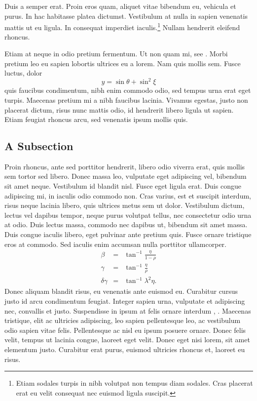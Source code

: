 Duis a semper erat. Proin eros quam, aliquet vitae bibendum eu, vehicula et purus. In hac habitasse platea dictumst. Vestibulum at nulla in sapien venenatis mattis ut eu ligula. In consequat imperdiet iaculis.\footnote{Etiam sodales turpis in nibh volutpat non tempus diam sodales. Cras placerat erat eu velit consequat nec euismod ligula suscipit.} Nullam hendrerit eleifend rhoncus.

Etiam at neque in odio pretium fermentum. Ut non quam mi, see \cite{hyvarinen2001ica}. Morbi pretium leo eu sapien lobortis ultrices eu a lorem. Nam quis mollis sem. Fusce luctus, dolor $$
y=\sin\theta+\sin^2\xi
$$quis faucibus condimentum, nibh enim commodo odio, sed tempus urna erat eget turpis. Maecenas pretium mi a nibh faucibus lacinia. Vivamus egestas, justo non placerat dictum, risus nunc mattis odio, id hendrerit libero ligula ut sapien. Etiam feugiat rhoncus arcu, sed venenatis ipsum mollis quis.

\subsection{A Subsection}
Proin rhoncus, ante sed porttitor hendrerit, libero odio viverra erat, quis mollis sem tortor sed libero. Donec massa leo, vulputate eget adipiscing vel, bibendum sit amet neque. Vestibulum id blandit nisl. Fusce eget ligula erat. Duis congue adipiscing mi, in iaculis odio commodo non. Cras varius, est et suscipit interdum, risus neque lacinia libero, quis ultrices metus sem ut dolor. Vestibulum dictum, lectus vel dapibus tempor, neque purus volutpat tellus, nec consectetur odio urna at odio. Duis lectus massa, commodo nec dapibus ut, bibendum sit amet massa. Duis congue iaculis libero, eget pulvinar ante pretium quis. Fusce ornare tristique eros at commodo. Sed iaculis enim accumsan nulla porttitor ullamcorper. 
\begin{eqnarray}
\beta &=& \tan^{-1} \frac{\eta}{1-\rho}\\
\gamma&=&\tan^{-1}
\frac{\eta}{\rho}\\
 \delta \gamma &=& \tan^{-1} \lambda^2 \eta.
\end{eqnarray}
Donec aliquam blandit risus, eu venenatis ante euismod eu. Curabitur cursus justo id arcu condimentum feugiat. Integer sapien urna, vulputate et adipiscing nec, convallis et justo. Suspendisse in ipsum at felis ornare interdum \cite{tulone2006pts}, \cite{jain2004ass}. Maecenas tristique, elit ac ultricies adipiscing, leo sapien pellentesque leo, ac vestibulum odio sapien vitae felis. Pellentesque ac nisl eu ipsum posuere ornare. Donec felis velit, tempus ut lacinia congue, laoreet eget velit. Donec eget nisi lorem, sit amet elementum justo. Curabitur erat purus, euismod ultricies rhoncus et, laoreet eu risus. 


